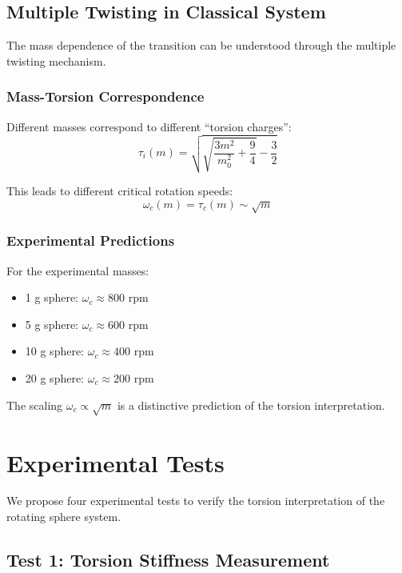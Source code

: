 \documentclass[UTF8]{ctex}\n\documentclass[12pt,a4paper]{article}
\begin{document}
\subsection{Multiple Twisting in Classical System}

The mass dependence of the transition can be understood through the multiple twisting mechanism.

\subsubsection{Mass-Torsion Correspondence}

Different masses correspond to different ``torsion charges'':
\begin{equation}
    \tau_i(m) = \sqrt{\sqrt{\frac{3m^2}{m_0^2} + \frac{9}{4}} - \frac{3}{2}}
\end{equation}

This leads to different critical rotation speeds:
\begin{equation}
    \omega_c(m) = \tau_c(m) \sim \sqrt{m}
\end{equation}

\subsubsection{Experimental Predictions}

For the experimental masses:
\begin{itemize}
    \item 1 g sphere: $\omega_c \approx 800$ rpm
    \item 5 g sphere: $\omega_c \approx 600$ rpm  
    \item 10 g sphere: $\omega_c \approx 400$ rpm
    \item 20 g sphere: $\omega_c \approx 200$ rpm
\end{itemize}

The scaling $\omega_c \propto \sqrt{m}$ is a distinctive prediction of the torsion interpretation.

\section{Experimental Tests}
\label{sec:tests}

We propose four experimental tests to verify the torsion interpretation of the rotating sphere system.

\subsection{Test 1: Torsion Stiffness Measurement}
\end{document}
